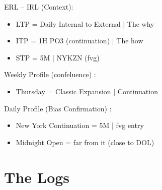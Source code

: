 \documentclass{article}
\begin{document}
\begin{enumerate}
\begin{notebox}
  \item ERL -- IRL (Context): 
\end{notebox}

\begin{itemize} 
  \item LTP = \hspace{0.3pt} Daily Internal to External | The why \vspace{0.2cm}
  \item ITP = \hspace{0.3pt} 1H PO3 (continuation) | The how \vspace{0.2cm}
  \item STP = \hspace{0.3pt} 5M | NYKZN (fvg) \vspace{0.2cm}
\end{itemize}

\begin{notebox}
    \item Weekly Profile (confeluence)  : 
\end{notebox}
\vspace{0.07cm}

\begin{itemize} 
  \item Thursday  = \hspace{0.3pt} Classic Expansion | Continuation
\end{itemize}

\vspace{0.07cm}
\begin{notebox}
    \item Daily Profile (Bias Confirmation)  : 
\end{notebox}

\vspace{0.07cm}
\begin{itemize} 
  \item New York Continuation = \hspace{0.3pt} 5M |  fvg entry
  \item Midnight Open = \hspace{0.3pt} far from it (close to DOL)

\end{itemize}
\end{enumerate}

\section{The Logs}
\vspace{0.3cm}
\end{document}
